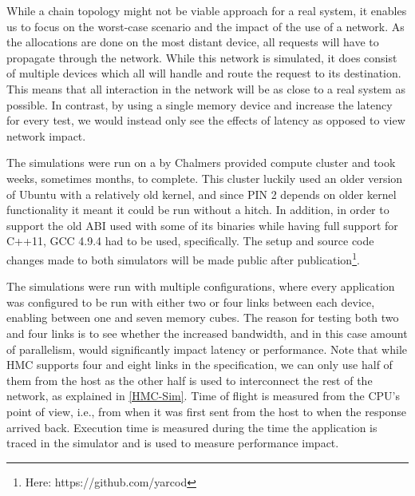 While a chain topology might not be viable approach for a real system, it enables us to focus on the worst-case scenario and the impact of the use of a network. As the allocations are done on the most distant device, all requests will have to propagate through the network. While this network is simulated, it does consist of multiple devices which all will handle and route the request to its destination. This means that all interaction in the network will be as close to a real system as possible. In contrast, by using a single memory device and increase the latency for every test, we would instead only see the effects of latency as opposed to view network impact.
\bigskip

The simulations were run on a by Chalmers provided compute cluster and took weeks, sometimes months, to complete. This cluster luckily used an older version of Ubuntu with a relatively old kernel, and since PIN 2 depends on older kernel functionality it meant it could be run without a hitch. In addition, in order to support the old ABI used with some of its binaries while having full support for C++11, GCC 4.9.4 had to be used, specifically. The setup and source code changes made to both simulators will be made public after publication\footnote{Here: https://github.com/yarcod}. 
\bigskip

The simulations were run with multiple configurations, where every application was configured to be run with either two or four links between each device, enabling between one and seven memory cubes. The reason for testing both two and four links is to see whether the increased bandwidth, and in this case amount of parallelism, would significantly impact latency or performance. Note that while HMC supports four and eight links in the specification, we can only use half of them from the host as the other half is used to interconnect the rest of the network, as explained in \ref{HMC-Sim}. Time of flight is measured from the CPU's point of view, i.e., from when it was first sent from the host to when the response arrived back. Execution time is measured during the time the application is traced in the simulator and is used to measure performance impact.
\bigskip
